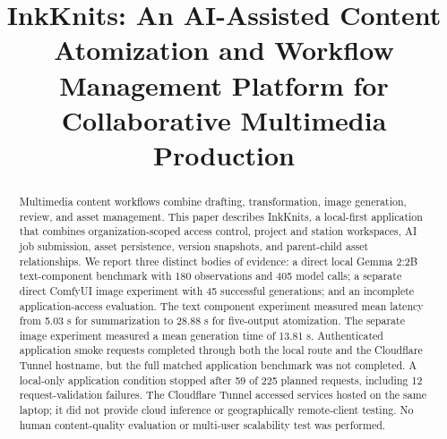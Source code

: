 \documentclass[conference]{IEEEtran}
\begin{document}
\title{InkKnits: An AI-Assisted Content Atomization and Workflow Management Platform for Collaborative Multimedia Production}

\author{
}

\maketitle

\begin{abstract}
Multimedia content workflows combine drafting, transformation, image generation, review, and asset management. This paper describes InkKnits, a local-first application that combines organization-scoped access control, project and station workspaces, AI job submission, asset persistence, version snapshots, and parent-child asset relationships. We report three distinct bodies of evidence: a direct local Gemma 2:2B text-component benchmark with 180 observations and 405 model calls; a separate direct ComfyUI image experiment with 45 successful generations; and an incomplete application-access evaluation. The text component experiment measured mean latency from 5.03 s for summarization to 28.88 s for five-output atomization. The separate image experiment measured a mean generation time of 13.81 s. Authenticated application smoke requests completed through both the local route and the Cloudflare Tunnel hostname, but the full matched application benchmark was not completed. A local-only application condition stopped after 59 of 225 planned requests, including 12 request-validation failures. The Cloudflare Tunnel accessed services hosted on the same laptop; it did not provide cloud inference or geographically remote-client testing. No human content-quality evaluation or multi-user scalability test was performed.
\end{abstract}
\end{document}
